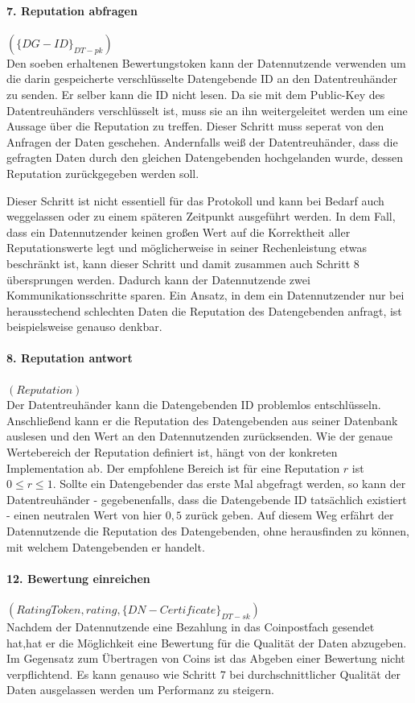 \documentclass{scrreprt}
\begin{document}
\paragraph{7. Reputation abfragen}$({\{DG-ID\}}_{DT-pk})$\\
Den soeben erhaltenen Bewertungstoken kann der Datennutzende verwenden um die darin gespeicherte verschlüsselte Datengebende ID an den Datentreuhänder zu senden. Er selber kann die ID nicht lesen. Da sie mit dem Public-Key des Datentreuhänders verschlüsselt ist, muss sie an ihn weitergeleitet werden um eine Aussage über die Reputation zu treffen. Dieser Schritt muss seperat von den Anfragen der Daten geschehen. Andernfalls weiß der Datentreuhänder, dass die gefragten Daten durch den gleichen Datengebenden hochgelanden wurde, dessen Reputation zurückgegeben werden soll.

Dieser Schritt ist nicht essentiell für das Protokoll und kann bei Bedarf auch weggelassen oder zu einem späteren Zeitpunkt ausgeführt werden. In dem Fall, dass ein Datennutzender keinen großen Wert auf die Korrektheit aller Reputationswerte legt und möglicherweise in seiner Rechenleistung etwas beschränkt ist, kann dieser Schritt und damit zusammen auch Schritt 8 übersprungen werden. Dadurch kann der Datennutzende zwei Kommunikationsschritte sparen. Ein Ansatz, in dem ein Datennutzender nur bei herausstechend schlechten Daten die Reputation des Datengebenden anfragt, ist beispielsweise genauso denkbar.

\paragraph{8. Reputation antwort}$(Reputation)$\\
Der Datentreuhänder kann die Datengebenden ID problemlos entschlüsseln. Anschließend kann er die Reputation des Datengebenden aus seiner Datenbank auslesen und den Wert an den Datennutzenden zurücksenden. Wie der genaue Wertebereich der Reputation definiert ist, hängt von der konkreten Implementation ab. Der empfohlene Bereich ist für eine Reputation $r$ ist $0\leq r\leq 1$. Sollte ein Datengebender das erste Mal abgefragt werden, so kann der Datentreuhänder - gegebenenfalls, dass die Datengebende ID tatsächlich existiert - einen neutralen Wert von hier $0,5$ zurück geben. Auf diesem Weg erfährt der Datennutzende die Reputation des Datengebenden, ohne herausfinden zu können, mit welchem Datengebenden er handelt.

\paragraph{12. Bewertung einreichen}$(RatingToken, rating, {\{DN-Certificate\}}_{DT-sk})$\\
Nachdem der Datennutzende eine Bezahlung in das Coinpostfach gesendet hat,hat er die Möglichkeit eine Bewertung für die Qualität der Daten abzugeben. Im Gegensatz zum Übertragen von Coins ist das Abgeben einer Bewertung nicht verpflichtend. Es kann genauso wie Schritt 7 bei durchschnittlicher Qualität der Daten ausgelassen werden um Performanz zu steigern. 
\end{document}
